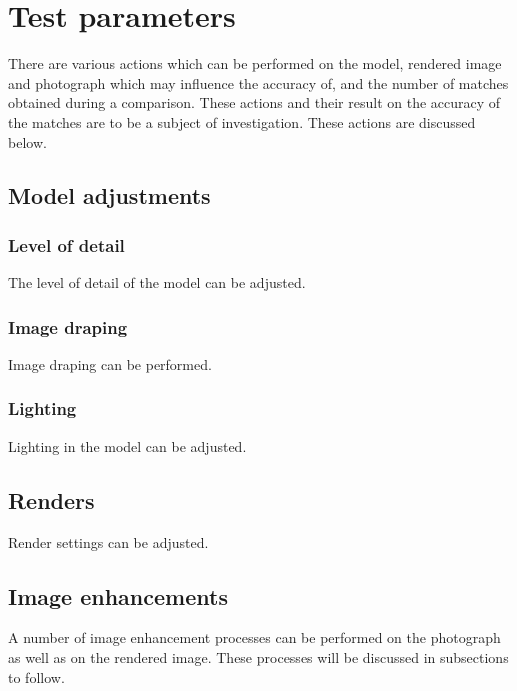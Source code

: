 \documentclass[11pt,a4paper]{report}
\begin{document}
	\section{Test parameters}
		There are various actions which can be performed on the model, rendered image and photograph which may influence the accuracy of, and the number of matches obtained during a comparison. These actions and their result on the accuracy of the matches are to be a subject of investigation. These actions are discussed below.
		
		\subsection{Model adjustments}
			\subsubsection{Level of detail}
				The level of detail of the model can be adjusted.
				
			\subsubsection{Image draping}
				Image draping can be performed.
			
			\subsubsection{Lighting}
				Lighting in the model can be adjusted.
		
		\subsection{Renders}
			Render settings can be adjusted.
			
		\subsection{Image enhancements}
			A number of image enhancement processes can be performed on the photograph as well as on the rendered image. These processes will be discussed in subsections to follow.
\end{document}
